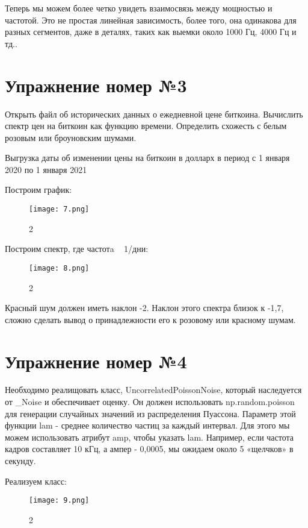 \documentclass[10pt,a4paper,oneside]{article}
\begin{document}
Теперь мы можем более четко увидеть взаимосвязь между мощностью и частотой. Это не простая линейная зависимость, более того, она одинакова для разных сегментов, даже в деталях, таких как выемки около 1000 Гц, 4000 Гц и тд..


\section{Упражнение номер №3}

Открыть файл об исторических данных о ежедневной цене биткоина. Вычислить спектр цен на биткоин как функцию времени. Определить схожесть с  белым розовым или броуновским шумами.

Выгрузка даты об изменении цены на биткоин в долларх в период с 1 января 2020 по 1 января 2021

Построим график: 

\begin{figure}[H]
        \centering
        \texttt{[image: 7.png]}
        \caption{2}
        \label{fig:first}
\end{figure}

Построим спектр, где частотa ~ 1/дни:

\begin{figure}[H]
        \centering
        \texttt{[image: 8.png]}
        \caption{2}
        \label{fig:first}
\end{figure}

Красный шум должен иметь наклон -2. Наклон этого спектра близок к -1,7, сложно сделать вывод о принадлежности его к розовому или красному шумам.

\section{Упражнение номер №4}

Необходимо реалищовать класс, UncorrelatedPoissonNoise, который наследуется от _Noise и обеспечивает оценку. Он должен использовать np.random.poisson для генерации случайных значений из распределения Пуассона. Параметр этой функции lam - среднее количество частиц за каждый интервал. Для этого мы можем использовать атрибут amp, чтобы указать lam. Например, если частота кадров составляет 10 кГц, а ампер - 0,0005, мы ожидаем около 5 «щелчков» в секунду.

Реализуем класс: 

\begin{figure}[H]
        \centering
        \texttt{[image: 9.png]}
        \caption{2}
        \label{fig:first}
\end{figure}
\end{document}
